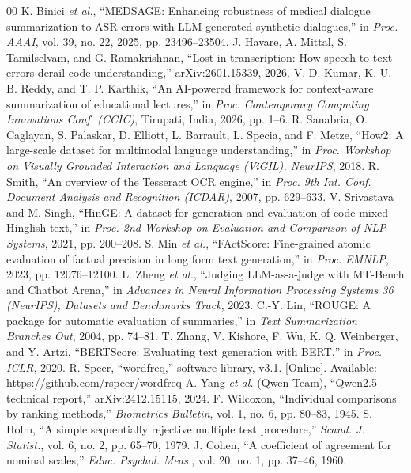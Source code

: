 \documentclass[conference]{IEEEtran}
\begin{document}
\begin{thebibliography}{00}
 K. Binici \textit{et al.}, ``MEDSAGE: Enhancing robustness of medical dialogue summarization to ASR errors with LLM-generated synthetic dialogues,'' in \textit{Proc. AAAI}, vol. 39, no. 22, 2025, pp. 23496--23504.
 J. Havare, A. Mittal, S. Tamilselvam, and G. Ramakrishnan, ``Lost in transcription: How speech-to-text errors derail code understanding,'' arXiv:2601.15339, 2026.
 V. D. Kumar, K. U. B. Reddy, and T. P. Karthik, ``An AI-powered framework for context-aware summarization of educational lectures,'' in \textit{Proc. Contemporary Computing Innovations Conf. (CCIC)}, Tirupati, India, 2026, pp. 1--6.
 R. Sanabria, O. Caglayan, S. Palaskar, D. Elliott, L. Barrault, L. Specia, and F. Metze, ``How2: A large-scale dataset for multimodal language understanding,'' in \textit{Proc. Workshop on Visually Grounded Interaction and Language (ViGIL), NeurIPS}, 2018.
 R. Smith, ``An overview of the Tesseract OCR engine,'' in \textit{Proc. 9th Int. Conf. Document Analysis and Recognition (ICDAR)}, 2007, pp. 629--633.
 V. Srivastava and M. Singh, ``HinGE: A dataset for generation and evaluation of code-mixed Hinglish text,'' in \textit{Proc. 2nd Workshop on Evaluation and Comparison of NLP Systems}, 2021, pp. 200--208.
 S. Min \textit{et al.}, ``FActScore: Fine-grained atomic evaluation of factual precision in long form text generation,'' in \textit{Proc. EMNLP}, 2023, pp. 12076--12100.
 L. Zheng \textit{et al.}, ``Judging LLM-as-a-judge with MT-Bench and Chatbot Arena,'' in \textit{Advances in Neural Information Processing Systems 36 (NeurIPS), Datasets and Benchmarks Track}, 2023.
 C.-Y. Lin, ``ROUGE: A package for automatic evaluation of summaries,'' in \textit{Text Summarization Branches Out}, 2004, pp. 74--81.
 T. Zhang, V. Kishore, F. Wu, K. Q. Weinberger, and Y. Artzi, ``BERTScore: Evaluating text generation with BERT,'' in \textit{Proc. ICLR}, 2020.
 R. Speer, ``wordfreq,'' software library, v3.1. [Online]. Available: \url{https://github.com/rspeer/wordfreq}
 A. Yang \textit{et al.} (Qwen Team), ``Qwen2.5 technical report,'' arXiv:2412.15115, 2024.
 F. Wilcoxon, ``Individual comparisons by ranking methods,'' \textit{Biometrics Bulletin}, vol. 1, no. 6, pp. 80--83, 1945.
 S. Holm, ``A simple sequentially rejective multiple test procedure,'' \textit{Scand. J. Statist.}, vol. 6, no. 2, pp. 65--70, 1979.
 J. Cohen, ``A coefficient of agreement for nominal scales,'' \textit{Educ. Psychol. Meas.}, vol. 20, no. 1, pp. 37--46, 1960.
\end{thebibliography}
\end{document}
